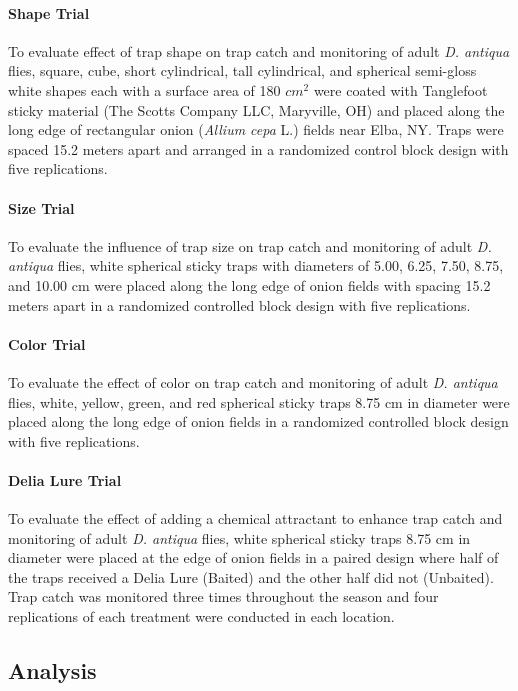 \documentclass[alpha-refs]{wiley-article}
\begin{document}
\paragraph{Shape Trial} To evaluate effect of trap shape on trap catch and monitoring of adult \textit{D. antiqua} flies, square, cube, short cylindrical, tall cylindrical, and spherical semi-gloss white shapes each with a surface area of 180 $cm^2$  were coated with Tanglefoot sticky material (The Scotts Company LLC, Maryville, OH) and placed along the long edge of rectangular onion (\textit{Allium cepa} L.) fields near Elba, NY. Traps were spaced 15.2 meters apart and arranged in a randomized control block design with five replications.   

\paragraph{Size Trial}
To evaluate the influence of trap size on trap catch and monitoring of adult \textit{D. antiqua} flies, white spherical sticky traps with diameters of 5.00, 6.25, 7.50, 8.75, and 10.00 cm were placed along the long edge of onion fields with spacing 15.2 meters apart in a randomized controlled block design with five replications.  

\paragraph{Color Trial}
To evaluate the effect of color on trap catch and monitoring of adult \textit{D. antiqua} flies, white, yellow, green, and red spherical sticky traps 8.75 cm in diameter were placed along the long edge of onion fields in a randomized controlled block design with five replications.  

\paragraph{Delia Lure Trial}
To evaluate the effect of adding a chemical attractant to enhance trap catch and monitoring of adult \textit{D. antiqua} flies, white spherical sticky traps 8.75 cm in diameter were placed at the edge of onion fields in a paired design where half of the traps received a Delia Lure (Baited) and the other half did not (Unbaited). Trap catch was monitored three times throughout the season and four replications of each treatment were conducted in each location.  


\subsection{Analysis}
\end{document}
